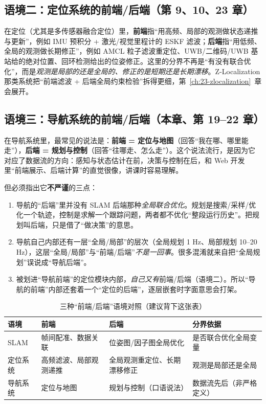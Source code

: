 \subsection{语境二：定位系统的前端/后端（第 9、10、23 章）}

在定位（尤其是多传感器融合定位）里，\textbf{前端}指“用高频、局部的观测做状态递推与更新”，例如 IMU 预积分 + 激光/视觉里程计的 ESKF 滤波；\textbf{后端}指“用低频、全局的观测做长期修正”，例如 AMCL 粒子滤波重定位、UWB/二维码/UWB 基站给的绝对位置、回环检测给出的位姿修正。这里的分界不再是“有没有联合优化”，而是\emph{观测是局部的还是全局的、修正的是短期还是长期漂移}。Z-Localization 那类系统把“前端滤波 + 后端全局约束检验”拆得更细，第~\ref{ch:23-zlocalization}~章会展开。

\subsection{语境三：导航系统的前端/后端（本章、第 19--22 章）}

在导航系统里，最常见的说法是：\textbf{前端 = 定位与地图}（回答“我在哪、哪里能走”），\textbf{后端 = 规划与控制}（回答“往哪走、怎么走”）。这个说法流行，是因为它对应了数据流的方向：感知与状态估计在前，决策与控制在后，和 Web 开发里“前端展示、后端计算”的直觉很像，讲课时容易理解。

但必须指出它\textbf{不严谨}的三点：

\begin{enumerate}
  \item 导航的“后端”里并没有 SLAM 后端那种\emph{全局联合优化}。规划是搜索/采样/优化一个轨迹，控制是求解一个跟踪问题，两者都不优化“整段运行历史”。把规划叫后端，只是借了“做决策”的意思。
  \item 导航自己内部还有一层“全局/局部”的层次（全局规划 1 Hz、局部规划 10--20 Hz），这层“全局/局部”与“前端/后端”\emph{不是一回事}。很多混淆就来自把“全局规划”误说成“导航后端”。
  \item 被划进“导航前端”的定位模块内部，\emph{自己又有}前端/后端（语境二）。所以“导航的前端”内部还套着一个“定位的后端”，逐层嵌套时字面意思会打架。
\end{enumerate}

\begin{table}[htbp]
  \centering
  \caption{三种“前端/后端”语境对照（建议背下这张表）}
  \label{tab:18-fb}
  \small
  \begin{tabular}{p{1.6cm}p{3.6cm}p{3.9cm}p{3.5cm}}
    \toprule
    语境 & 前端 & 后端 & 分界依据 \\
    \midrule
    SLAM & 帧间配准、数据关联 & 位姿图/因子图全局优化 & 是否联合优化全局变量 \\
    定位系统 & 高频滤波、局部观测递推 & 全局观测重定位、长期漂移修正 & 观测是局部还是全局 \\
    导航系统 & 定位与地图 & 规划与控制（口语说法） & 数据流先后（非严格定义） \\
    \bottomrule
  \end{tabular}
\end{table}


